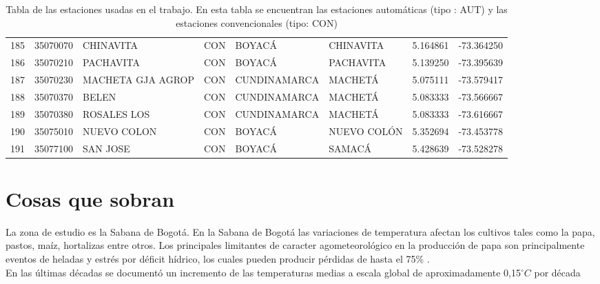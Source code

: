 \documentclass[11pt]{article}
\def\celc{$^{\circ}C$ }%
\begin{document}
\begin{table}
\begin{tabular}{lrllllrr}
185 &  35070070 &             CHINAVITA     &  CON &        BOYACÁ &         CHINAVITA &  5.164861 & -73.364250 \\
186 &  35070210 &                PACHAVITA  &  CON &        BOYACÁ &         PACHAVITA &  5.139250 & -73.395639 \\
187 &  35070230 &         MACHETA GJA AGROP &  CON &  CUNDINAMARCA &           MACHETÁ &  5.075111 & -73.579417 \\
188 &  35070370 &                    BELEN  &  CON &  CUNDINAMARCA &           MACHETÁ &  5.083333 & -73.566667 \\
189 &  35070380 &              ROSALES LOS  &  CON &  CUNDINAMARCA &           MACHETÁ &  5.083333 & -73.616667 \\
190 &  35075010 &            NUEVO COLON    &  CON &        BOYACÁ &       NUEVO COLÓN &  5.352694 & -73.453778 \\
191 &  35077100 &                SAN JOSE   &  CON &        BOYACÁ &            SAMACÁ &  5.428639 & -73.528278 \\
\bottomrule

\end{tabular}
\fi
\caption{Tabla de las estaciones usadas en el trabajo. En esta tabla se encuentran las estaciones automáticas (tipo : AUT) y las estaciones convencionales (tipo: CON)}
\label{tab:estaciones}
\end{table}

\section{Cosas que sobran}


La zona de estudio es la Sabana de Bogotá. En la Sabana de Bogotá las variaciones de temperatura afectan los cultivos tales como la papa, pastos, maíz, hortalizas entre otros. Los principales limitantes de caracter agometeorológico en la producción de papa son principalmente eventos de heladas y estrés por déficit hídrico, los cuales pueden producir pérdidas de hasta el 75\% \citep{DANE2002}.\\

En las últimas décadas se documentó un incremento de las temperaturas medias a escala global de aproximadamente 0,15\celc por década \citep{jones2001} 



{}%
\end{document}
